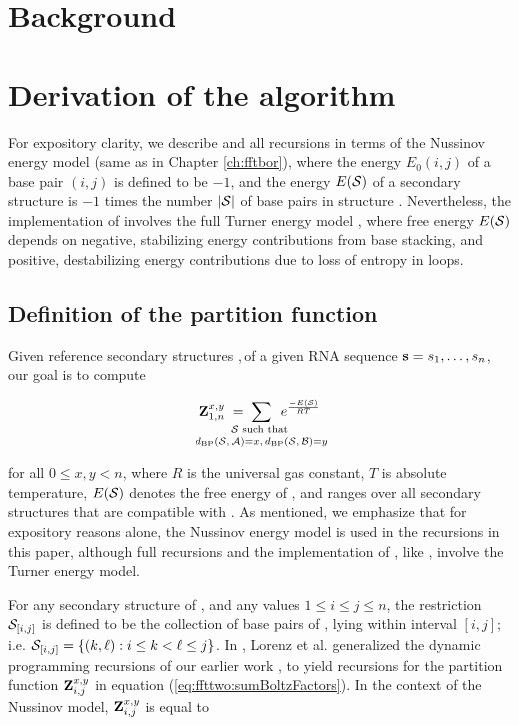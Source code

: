\section{Background}
\label{sec:ffttwo:bkgrnd}

\section{Derivation of the \ffttwo algorithm}
\label{sec:ffttwo:math}

For expository clarity, we describe \ffttwo and all recursions
in terms of the Nussinov energy model \cite{nussinovjacobson}
(same as in Chapter \ref{ch:fftbor}), where
the energy $E_0(i,j)$ of a base pair $(i,j)$ is defined to be $-1$, and the
energy $E(\mathcal S)$ of a secondary structure \str is $-1$ times the number $|\mathcal S|$
of base pairs in structure \str.  Nevertheless, the implementation of
\ffttwo involves the full Turner energy model \cite{xia:RNA}, where
free energy $E(\mathcal S)$ depends on negative, stabilizing energy contributions
from base stacking, and positive, destabilizing energy contributions due to
loss of entropy in loops.

\subsection{Definition of the partition function
\texorpdfstring{}{}}
\label{subsec:ffttwo:recursions}

Given reference secondary structures \strA,\,\strB of a
given RNA sequence ${\bf s}=s_1,\dots,s_n$, our goal is to compute

\begin{align}
\label{eq:ffttwo:sumBoltzFactors}
\bfZ{x,y}{1,n}\;=\;
\sum_{\mathclap{\substack{
\str \text{ such that } \rule[-.5ex]{0pt}{0pt} \\
\dBP{\str}{\strA} = x,\,\dBP{\str}{\strB} = y}}}\enspace
\boltzF{\str}
\end{align}

for all $0 \leq x,y < n$, where $R$ is the universal gas constant, $T$
is absolute temperature, $E(\mathcal S)$ denotes the free energy of \str,
and \str ranges
over all secondary structures that are compatible with \seq. As mentioned,
we emphasize that for expository reasons alone, the Nussinov energy model is
used in the recursions in this paper, although full recursions and
the implementation of \ffttwo, like \fftbor, involve the Turner energy model.

For any secondary structure \str of \seq, and any values
$1 \leq i \leq j \leq n$, the restriction $\mathcal S_{[i,j]}$ is defined to be the
collection of base pairs of \str, lying within interval $[i,j]$; i.e.
$\mathcal S_{[i,j]} = \{ (k, \ell) : i \leq k < \ell \leq j \}$.
In \cite{hofacker:RNAbor2D}, Lorenz et al. generalized
the dynamic programming recursions of our earlier work \cite{Freyhult.b07},
to yield recursions
for the partition function ${\bf Z}^{x,y}_{i,j}$ in equation
(\ref{eq:ffttwo:sumBoltzFactors}). In the context of the Nussinov model,
${\bf Z}^{x,y}_{i,j}$ is equal to

